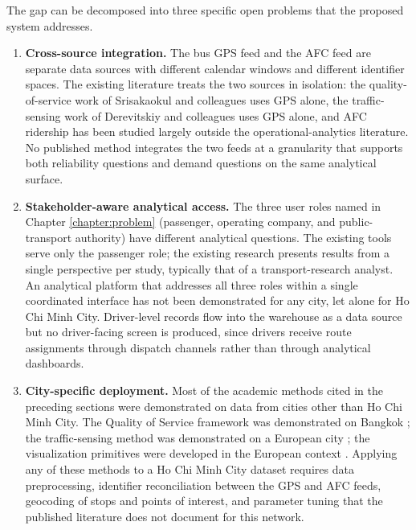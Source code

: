 The gap can be decomposed into three specific open problems that the proposed system
addresses.

\begin{enumerate}
  \item \noindent\textbf{Cross-source integration.} The bus GPS feed and the AFC feed are
        separate data sources with different calendar windows and different identifier
        spaces. The existing literature treats the two sources in isolation: the
        quality-of-service work of Srisakaokul and colleagues uses GPS alone, the
        traffic-sensing work of Derevitskiy and colleagues uses GPS alone, and AFC
        ridership has been studied largely outside the operational-analytics literature.
        No published method integrates the two feeds at a granularity that supports both
        reliability questions and demand questions on the same analytical surface.
  \item \noindent\textbf{Stakeholder-aware analytical access.} The three user roles named
        in Chapter \ref{chapter:problem} (passenger, operating company, and
        public-transport authority) have different analytical questions. The existing
        tools serve only the passenger role; the existing research presents results from
        a single perspective per study, typically that of a transport-research analyst.
        An analytical platform that addresses all three roles within a single
        coordinated interface has not been demonstrated for any city, let alone for
        Ho Chi Minh City. Driver-level records flow into the warehouse as a data
        source but no driver-facing screen is produced, since drivers receive route
        assignments through dispatch channels rather than through analytical dashboards.
  \item \noindent\textbf{City-specific deployment.} Most of the academic methods cited
        in the preceding sections were demonstrated on data from cities other than
        Ho Chi Minh City. The Quality of Service framework was demonstrated on Bangkok
        \cite{srisakaokul2023}; the traffic-sensing method was demonstrated on a
        European city \cite{derevitskiy2016}; the visualization primitives were
        developed in the European context \cite{liu2022}. Applying any of these methods
        to a Ho Chi Minh City dataset requires data preprocessing, identifier
        reconciliation between the GPS and AFC feeds, geocoding of stops and points of
        interest, and parameter tuning that the published literature does not document
        for this network.
\end{enumerate}

